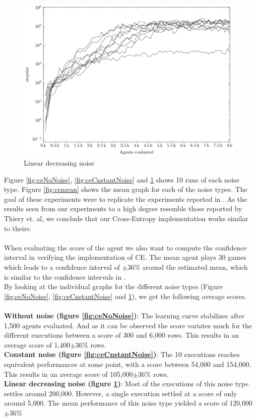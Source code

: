 \begin{figure}[H]
\begin{center}
\includegraphics[scale=0.48]{plots/linearNoisePlot}
\end{center}
\caption{Linear decreasing noise \label{fig:ceLinNoise}}
\end{figure}

Figure \ref{fig:ceNoNoise}, \ref{fig:ceCnstantNoise} and
\ref{fig:ceLinNoise} shows 10 runs of each noise type. Figure
\ref{fig:cemean} shows the mean graph for each of the noise types.
The goal of these experiments were to replicate the experiments 
reported in \citep{thiery:09}. As the results seen from our experiments
to a high degree resemble those reported by Thiery et. al, we conclude
that our Cross-Entropy implementation works similar to theirs.\\
\\
When evaluating the score of the agent we also want to compute the confidence
interval in verifying the implementation of CE. The mean agent plays 30 games
which leads to a confidence interval of $\pm36\%$ around the estimated mean,
which is similar to the confidence intervals in \citep{scherrer2009}.\\
By looking at the individual graphs for the different noise types 
(Figure \ref{fig:ceNoNoise}, \ref{fig:ceCnstantNoise} and
\ref{fig:ceLinNoise}), we get the following average scores.\\
\\
\textbf{Without noise (figure \ref{fig:ceNoNoise})}: The learning curve
stabilizes after 1,500 agents evaluated. And as it can be observed the
score variates much for the different executions between a score of 300 and 6,000
rows. This results in an average score of 1,400$\pm36\%$ rows.\\
\textbf{Constant noise (figure \ref{fig:ceCnstantNoise})}: 
The 10 executions reaches equivalent performances at some point, 
with a score between
54,000 and 154,000. This results in an average score of 105,000$\pm36\%$ rows.\\
\textbf{Linear decreasing noise (figure \ref{fig:ceLinNoise})}:
Most of the executions of this noise type settles around 200,000.
However, a single execution settled at a score of only around 5,000.
The mean performance of this noise type yielded a score of
120,000$\pm36\%$ \\

